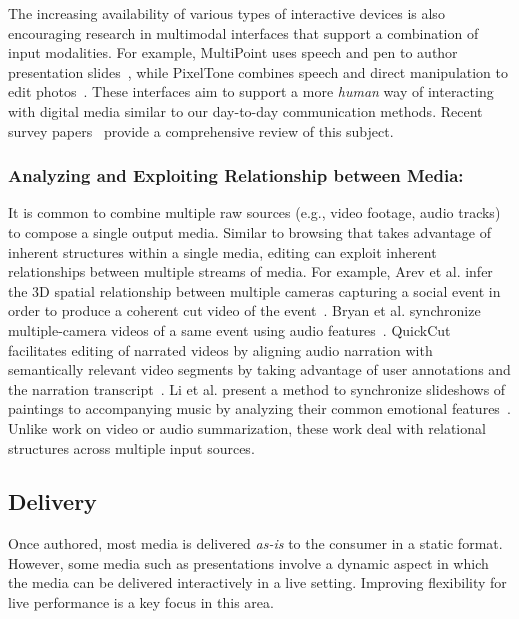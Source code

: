 The increasing availability of various types of interactive devices is also encouraging research in multimodal interfaces that support a combination of input modalities. For example, MultiPoint uses speech and pen to author presentation slides~\cite{sinha2001multipoint}, while PixelTone combines speech and direct manipulation to edit photos~\cite{laput2013pixeltone}. These interfaces aim to support a more \emph{human} way of interacting with digital media similar to our day-to-day communication methods. Recent survey papers~\cite{turk2014multimodal,dumas2009multimodal} provide a comprehensive review of this subject.\\

\subsubsection*{Analyzing and Exploiting Relationship between Media:} 
It is common to combine multiple raw sources (e.g., video footage, audio tracks) to compose a single output media. Similar to browsing that takes advantage of inherent structures within a single media, editing can exploit inherent relationships between multiple streams of media. For example, Arev et al. infer the 3D spatial relationship between multiple cameras capturing a social event in order to produce a coherent cut video of the event~\cite{arev2014automatic}. Bryan et al. synchronize multiple-camera videos of a same event using audio features~\cite{bryan2012clustering}. QuickCut facilitates editing of narrated videos by aligning audio narration with semantically relevant video segments by taking advantage of user annotations and the narration transcript~\cite{truong2016quickcut}. Li et al. present a method to synchronize slideshows of paintings to accompanying music by analyzing their common emotional features~\cite{li2007emotion}. Unlike work on video or audio summarization, these work deal with relational structures across multiple input sources. 

\subsection{Delivery}
Once authored, most media is delivered \emph{as-is} to the consumer in a static format. However, some media such as presentations involve a dynamic aspect in which the media can be delivered interactively in a live setting. Improving flexibility for live performance is a key focus in this area.

